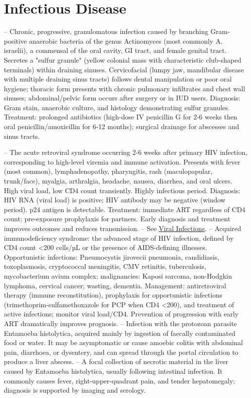 \chapter{Infectious Disease}

-- Chronic, progressive, granulomatous infection caused by branching Gram-positive anaerobic bacteria of the genus Actinomyces (most commonly A. israelii), a commensal of the oral cavity, GI tract, and female genital tract. Secretes a "sulfur granule" (yellow colonial mass with characteristic club-shaped terminals) within draining sinuses. Cervicofacial (lumpy jaw, mandibular disease with multiple draining sinus tracts) follows dental manipulation or poor oral hygiene; thoracic form presents with chronic pulmonary infiltrates and chest wall sinuses; abdominal/pelvic form occurs after surgery or in IUD users. Diagnosis: Gram stain, anaerobic culture, and histology demonstrating sulfur granules. Treatment: prolonged antibiotics (high-dose IV penicillin G for 2-6 weeks then oral penicillin/amoxicillin for 6-12 months); surgical drainage for abscesses and sinus tracts.

-- The acute retroviral syndrome occurring 2-6 weeks after primary HIV infection, corresponding to high-level viremia and immune activation. Presents with fever (most common), lymphadenopathy, pharyngitis, rash (maculopapular, trunk/face), myalgia, arthralgia, headache, nausea, diarrhea, and oral ulcers. High viral load, low CD4 count transiently. Highly infectious period. Diagnosis: HIV RNA (viral load) is positive; HIV antibody may be negative (window period). p24 antigen is detectable. Treatment: immediate ART regardless of CD4 count; pre-exposure prophylaxis for partners. Early diagnosis and treatment improves outcomes and reduces transmission.
-- See \hyperlink{Viral Infections}{Viral Infections}.
-- Acquired immunodeficiency syndrome: the advanced stage of HIV infection, defined by CD4 count <200 cells/µL or the presence of AIDS-defining illnesses. Opportunistic infections: Pneumocystis jirovecii pneumonia, candidiasis, toxoplasmosis, cryptococcal meningitis, CMV retinitis, tuberculosis, mycobacterium avium complex; malignancies: Kaposi sarcoma, non-Hodgkin lymphoma, cervical cancer; wasting, dementia. Management: antiretroviral therapy (immune reconstitution), prophylaxis for opportunistic infections (trimethoprim-sulfamethoxazole for PCP when CD4 <200), and treatment of active infections; monitor viral load/CD4. Prevention of progression with early ART dramatically improves prognosis.
-- Infection with the protozoan parasite Entamoeba histolytica, acquired mainly by ingestion of faecally contaminated food or water. It may be asymptomatic or cause amoebic colitis with abdominal pain, diarrhoea, or dysentery, and can spread through the portal circulation to produce a liver abscess.
-- A focal collection of necrotic material in the liver caused by Entamoeba histolytica, usually following intestinal infection. It commonly causes fever, right-upper-quadrant pain, and tender hepatomegaly; diagnosis is supported by imaging and serology.

